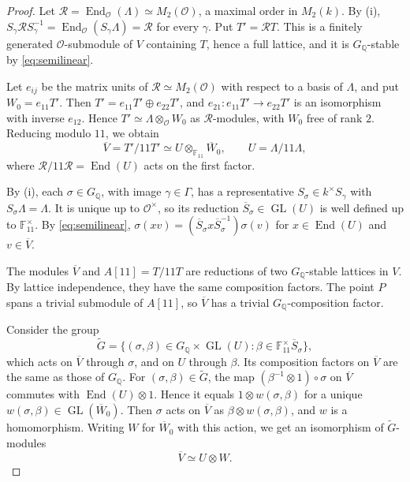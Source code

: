 \documentclass[11pt]{article}
\theoremstyle{remark}
\newcommand{\Q}{\mathbb Q}
\newcommand{\F}{\mathbb F}
\DeclareMathOperator{\End}{End}
\DeclareMathOperator{\GL}{GL}
\begin{document}
\begin{proof}
Let \(\mathcal R=\End_{\mathcal O}(\Lambda)\simeq M_2(\mathcal O)\),
a maximal order in \(M_2(k)\). By (i),
\(S_\gamma\mathcal R S_\gamma^{-1}=\End_{\mathcal O}(S_\gamma\Lambda)
=\mathcal R\) for every \(\gamma\). Put \(T'=\mathcal RT\). This is a
finitely generated \(\mathcal O\)-submodule of \(V\) containing \(T\),
hence a full lattice, and it is \(G_{\Q}\)-stable by
\eqref{eq:semilinear}.

Let \(e_{ij}\) be the matrix units of \(\mathcal R\simeq M_2(\mathcal O)\)
with respect to a basis of \(\Lambda\), and put \(W_0=e_{11}T'\). Then
\(T'=e_{11}T'\oplus e_{22}T'\), and \(e_{21}:e_{11}T'\to e_{22}T'\) is
an isomorphism with inverse \(e_{12}\). Hence
\(T'\simeq\Lambda\otimes_{\mathcal O}W_0\) as \(\mathcal R\)-modules,
with \(W_0\) free of rank \(2\). Reducing modulo \(11\), we obtain
\[
 \overline V=T'/11T'\simeq U\otimes_{\F_{11}}\overline W_0,
 \qquad U=\Lambda/11\Lambda,
\]
where \(\mathcal R/11\mathcal R=\End(U)\) acts on the first factor.

By (i), each \(\sigma\in G_{\Q}\), with image \(\gamma\in\Gamma\), has
a representative \(S_\sigma\in k^\times S_\gamma\) with
\(S_\sigma\Lambda=\Lambda\). It is unique up to \(\mathcal O^\times\),
so its reduction \(\overline S_\sigma\in\GL(U)\) is well defined up to
\(\F_{11}^\times\). By \eqref{eq:semilinear},
\(\sigma(xv)=(\overline S_\sigma x\overline S_\sigma^{-1})\sigma(v)\)
for \(x\in\End(U)\) and \(v\in\overline V\).

The modules \(\overline V\) and \(A[11]=T/11T\) are reductions of two
\(G_{\Q}\)-stable lattices in \(V\). By lattice independence, they have
the same composition factors. The point \(P\) spans a trivial
submodule of \(A[11]\), so \(\overline V\) has a trivial
\(G_{\Q}\)-composition factor.

Consider the group
\[
 \widetilde G=\{(\sigma,\beta)\in G_{\Q}\times\GL(U):
 \beta\in\F_{11}^\times\overline S_\sigma\},
\]
which acts on \(\overline V\) through \(\sigma\), and on \(U\) through
\(\beta\). Its composition factors on \(\overline V\) are the same as
those of \(G_{\Q}\). For \((\sigma,\beta)\in\widetilde G\), the map
\((\beta^{-1}\otimes1)\circ\sigma\) on \(\overline V\) commutes with
\(\End(U)\otimes1\). Hence it equals \(1\otimes w(\sigma,\beta)\) for a
unique \(w(\sigma,\beta)\in\GL(\overline W_0)\). Then \(\sigma\) acts
on \(\overline V\) as \(\beta\otimes w(\sigma,\beta)\), and \(w\) is a
homomorphism. Writing \(W\) for \(\overline W_0\) with this action, we
get an isomorphism of \(\widetilde G\)-modules
\[
 \overline V\simeq U\otimes W.
\]


\end{proof}
\end{document}
